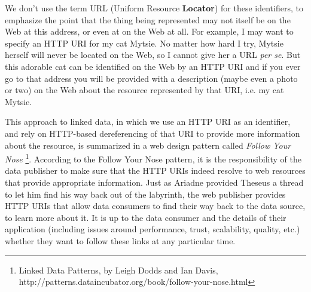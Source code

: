 We don't use the term URL (Uniform Resource \textbf{Locator}) for these identifiers, to emphasize the 
point that the thing  being
represented may not itself be on the Web at this address, or even at on the Web at all. For example, I
may want to specify an HTTP URI for my cat Mytsie. No matter how hard I
try, Mytsie herself will never be located on the Web, so I cannot give
her a URL \emph{per se}. But this adorable cat can be identified on the
Web by an HTTP URI and if you ever go to that address you will be
provided with a description (maybe even a photo or two) on the Web about the resource represented by
that URI, i.e. my cat Mytsie.

This approach to linked data, in which we use an HTTP URI as an identifier, and 
rely on HTTP-based dereferencing of that URI to provide more information about the resource, 
is summarized in a web design pattern called \emph{Follow Your Nose} \footnote{Linked Data Patterns, by Leigh Dodds and Ian Davis,
http://patterns.dataincubator.org/book/follow-your-nose.html}.
According to the  Follow Your Nose pattern,  it is the responsibility of the data publisher
to make sure that the HTTP URIs indeed resolve to web resources that provide
appropriate information. Just as Ariadne provided Theseus a thread to let him
find his way back out of the labyrinth, the web publisher provides HTTP URIs
that allow data consumers to find their way back to the data source, to
learn more about it.  It is up to the data consumer and the details of their application (including issues around performance, trust, scalability,
quality, etc.)
whether they want to follow these links at any particular time. 






